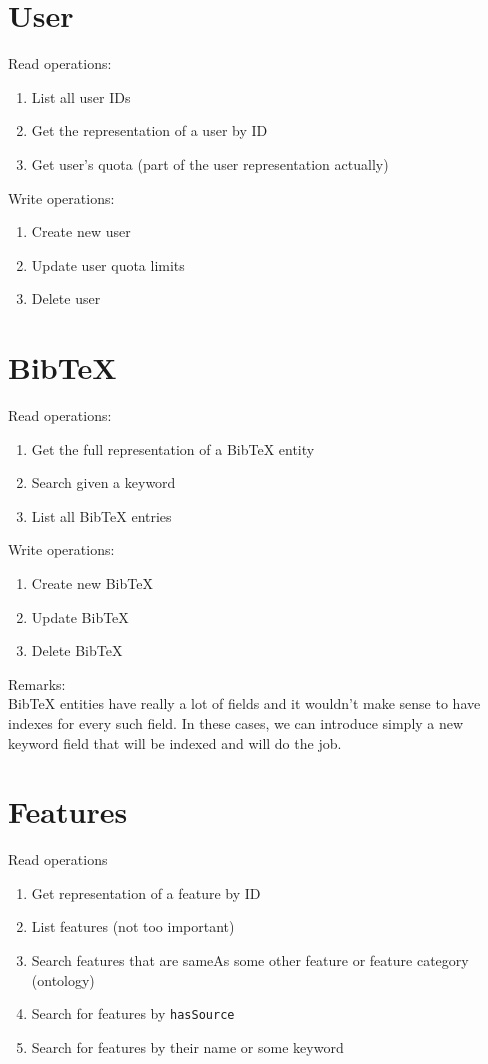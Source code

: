 \section{User}

\noindent Read operations:
\begin{enumerate}
 \item List all user IDs
 \item Get the representation of a user by ID
 \item Get user's quota (part of the user representation actually)
\end{enumerate}


\noindent Write operations:
\begin{enumerate}
  \item Create new user
  \item Update user quota limits
  \item Delete user
\end{enumerate}



\section{BibTeX}

\noindent Read operations:
\begin{enumerate}
\item Get the full representation of a BibTeX entity
\item Search given a keyword
\item List all BibTeX entries
\end{enumerate}

\noindent Write operations:
\begin{enumerate}
 \item Create new BibTeX
 \item Update BibTeX
 \item Delete BibTeX
\end{enumerate}


\noindent Remarks:\\
BibTeX entities have really a lot of fields and it wouldn’t make sense 
to have indexes for every such field. In these cases, we can introduce simply 
a new keyword field that will be indexed and will do the job.


\section{Features}
\noindent Read operations
\begin{enumerate}
 \item Get representation of a feature by ID
 \item List features (not too important)
 \item Search features that are sameAs some other feature or feature category (ontology)
 \item Search for features by \texttt{hasSource}
 \item Search for features by their name or some keyword
\end{enumerate}
 

